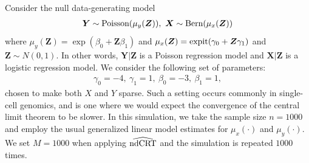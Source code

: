 \documentclass[aos]{imsart}
\theoremstyle{plain}
\theoremstyle{remark}
\newcommand{\srx}{X}									%
\newcommand{\sry}{Y}									%
\newcommand{\ndCRThat}{\widehat{\textnormal{ndCRT}}}	%
\begin{document}
 	Consider the null data-generating model 
	\begin{align*}
		\bm Y\sim \textnormal{Poisson}(\mu_y(\bm Z)),\ \bm X\sim \textnormal{Bern}(\mu_x(\bm Z))
	\end{align*}
	where $\mu_y(\bm Z)=\exp(\beta_0+\bm Z\beta_1)$ and $\mu_x(\bm Z)=\textnormal{expit}(\gamma_0+\bm Z\gamma_1)$ and $\bm Z\sim N(0,1)$. In other words,
	$\bm Y|\bm Z$ is a Poisson regression model and $\bm X|\bm Z$ is a logistic regression model. We consider the following set of parameters:
	\begin{align*}
		\gamma_0=-4,\ \gamma_1=1,\ \beta_0= -3,\ \beta_1= 1,
	\end{align*}
	chosen to make both $\srx$ and $\sry$ sparse. Such a setting occurs commonly in single-cell genomics, and is one where we would expect the convergence of the central limit theorem to be slower. In this simulation, we take the sample size $n=1000$ and employ the usual generalized linear model estimates for $\mu_{x}(\cdot)$ and $\mu_y(\cdot)$. We set $M=1000$ when applying $\ndCRThat$ and the simulation is repeated $1000$ times. 
\end{document}
